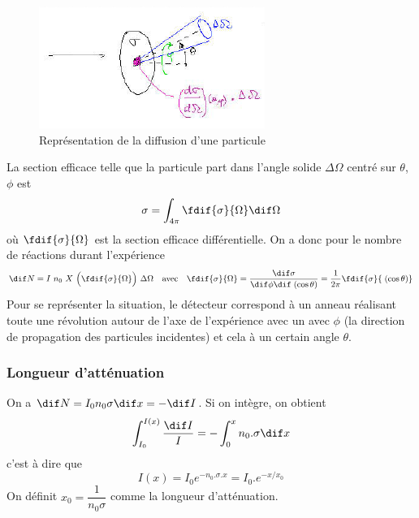 \begin{figure}[ht]
    \centering
    \includegraphics[scale=0.95]{Images1/secdiff.PNG}
    \caption{Représentation de la diffusion d'une particule}
    \label{fig:diffusion_particule}
\end{figure}
\noindent La section efficace telle que la particule part dans l'angle solide $\Delta\Omega$ centré sur $\theta$, $\phi$ est
\[
    \sigma=\int_{4\pi}^{}\fdif{\sigma}{\Omega}\dif \Omega
\]
où $\fdif{\sigma}{\Omega}$ est la section efficace différentielle. On a donc pour le nombre de réactions durant l'expérience
\[
    \dif N=I~n_0~X~\Big(\fdif{\sigma}{\Omega}\Big)~\Delta\Omega \quad\text{avec}\quad \fdif{\sigma}{\Omega}=\dfrac{\dif\sigma}{\dif\phi \dif \;(\cos{\theta})}=\dfrac{1}{2\pi}\fdif{\sigma}{\;(\cos{\theta})}
\]
Pour se représenter la situation, le détecteur correspond à un anneau réalisant toute une révolution autour de l'axe de l'expérience avec un avec $\phi$ (la direction de propagation des particules incidentes) et cela à un certain angle $\theta$.

\subsubsection{Longueur d'atténuation}
On a $\dif N=I_0 n_0 \sigma \dif x=-\dif I$. Si on intègre, on obtient
\[
    \int_{I_{0}}^{I(x)}\dfrac{\dif I}{I}=-\int_0^x n_0.\sigma \dif x
\]
c'est à dire que
\[
    I(x)=I_0e^{-n_0.\sigma.x}=I_0.e^{-x/x_0}
\]
On définit $x_0=\dfrac{1}{n_0\sigma}$ comme la longueur d'atténuation.

